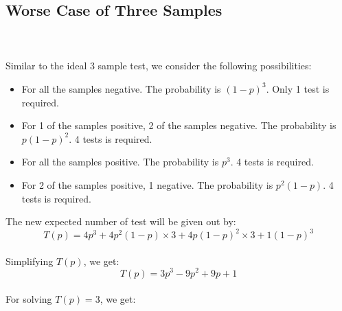 \subsection*{Worse Case of Three Samples}
\\
\\
Similar to the ideal 3 sample test, we consider the following possibilities:

\begin{itemize}
  \item For all the samples negative. The probability is $(1-p)^3$. Only 1 test is required.
  \item For 1 of the samples positive, 2 of the samples negative. The probability is $p(1-p)^2$. 4 tests is required.
  \item For all the samples positive. The probability is $p^3$. 4 tests is required.
  \item For 2 of the samples positive, 1 negative. The probability is $p^2(1-p)$.  4 tests is required.
\end{itemize}
The new expected number of test will be given out by:
\\
\begin{displaymath}
T(p)=4p^{3}+4p^{2}(1-p) \times 3+4p(1-p)^{2} \times 3 +1(1-p)^{3}
\end{displaymath}
\\
Simplifying $T(p)$, we get:
\\
\begin{displaymath}
T(p)=3p^3-9p^2+9p+1
\end{displaymath}
\\
For solving $T(p)=3$, we get:
\\
\begin{center}
\end{center}

